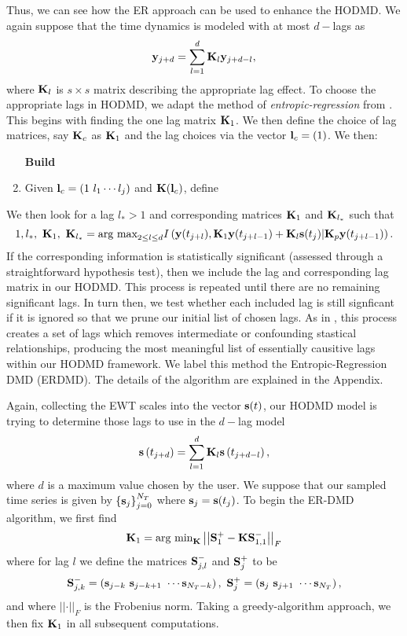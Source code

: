 \documentclass[a4paper,11pt]{article}
\newcommand{\gnorm}[1]{\left|\left|#1\right|\right|}
\begin{document}
Thus, we can see how the ER approach can be used to enhance the  HODMD.  We again suppose that the time dynamics is modeled with at most $d-$lags as 
\[
{\bf y}_{j+d} = \sum_{l=1}^{d}{\bf K}_{l}{\bf y}_{j+d-l}, 
\]
where ${\bf K}_{l}$ is $s \times s$ matrix describing the appropriate lag effect.  To choose the appropriate lags in HODMD, we adapt the method of {\it entropic-regression} from \cite{bollt2}.  This begins with finding the one lag matrix ${\bf K}_{1}$.  We then define the choice of lag matrices, say ${\bf K}_{c}$ as ${\bf K}_{1}$ and the lag choices via the vector ${\bf l}_{c}=(1)$.  We then:
\begin{enumerate}
\item [\textbf{Build}]
\item Given ${\bf l}_{c}=(1~l_{1} \cdots l_{j})$ and ${\bf K}({\bf l}_{c})$, define 
\end{enumerate}
We then look for a lag $l_{\ast}>1$ and corresponding matrices ${\bf K}_{1}$ and ${\bf K}_{l_{\ast}}$ such that 
\[
1, l_{\ast}, ~ {\bf K}_{1}, ~{\bf K}_{l_{\ast}} = \text{arg max}_{2\leq l \leq d} I\left({\bf y}(t_{j+l}), {\bf K}_{1}{\bf y}(t_{j+l-1}) + {\bf K}_{l}{\bf s}(t_{j})|{\bf K}_{p}{\bf y}(t_{j+l-1})\right).
\]
If the corresponding information is statistically significant (assessed through a straightforward hypothesis test), then we include the lag and corresponding lag matrix in our HODMD.  This process is repeated until there are no remaining significant lags.  In turn then, we test whether each included lag is still signficant if it is ignored so that we prune our initial list of chosen lags.  As in \cite{bollt}, this process creates a set of lags which removes intermediate or confounding stastical relationships, producing the most meaningful list of essentially causitive lags within our HODMD framework.  We label this method the Entropic-Regression DMD (ERDMD).  The details of the algorithm are explained in the Appendix.  

Again, collecting the EWT scales into the vector ${\bf s}(t)$, our HODMD model is trying to determine those lags to use in the $d-$lag model 
\[
{\bf s}\left(t_{j+d}\right) = \sum_{l=1}^{d}{\bf K}_{l}{\bf s}\left(t_{j+d-l}\right), 
\]
where $d$ is a maximum value chosen by the user. We suppose that our sampled time series is given by $\left\{{\bf s}_{j}\right\}_{j=0}^{N_{T}}$ where ${\bf s}_{j}={\bf s}(t_{j})$.  To begin the ER-DMD algorithm, we first find
\[
{\bf K}_{1} = \text{arg min}_{\bf K}\gnorm{{\bf S}^{+}_{1}-{\bf K}{\bf S}^{-}_{1,1}}_{F}
\]
where for lag $l$ we define the matrices ${\bf S}^{-}_{j,l}$ and ${\bf S}^{+}_{j}$ to be
\[
{\bf S}^{-}_{j,k} = \left( {\bf s}_{j-k} ~ {\bf s}_{j-k+1} ~ \cdots {\bf s}_{N_{T}-k} \right), ~ {\bf S}^{+}_{j} = \left( {\bf s}_{j} ~ {\bf s}_{j+1} ~ \cdots {\bf s}_{N_{T}} \right),
\] 
and where $\gnorm{\cdot}_{F}$ is the Frobenius norm.  Taking a greedy-algorithm approach, we then fix ${\bf K}_{1}$ in all subsequent computations.  
\end{document}
